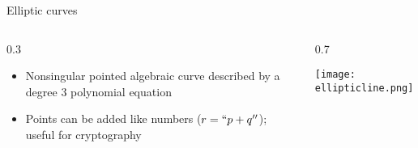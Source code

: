\documentclass{beamer}
\theoremstyle{definition}
\begin{document}
                                                                                                                                                                                                                      \begin{frame}{Elliptic curves}

                                                                                                                   \begin{columns}[c]
        \begin{column}{0.3\hsize}

          \begin{itemize}
            \item
          Nonsingular pointed algebraic curve described by a degree $3$
          polynomial equation
        \item Points can be added like numbers ($r=``p+q''$); useful for
          cryptography
          \end{itemize}
        \end{column}
        \begin{column}{0.7\hsize}

            \texttt{[image: ellipticline.png]}

        \end{column}
      \end{columns}
                                                                                                                                                                                                                      \end{frame}
\end{document}
